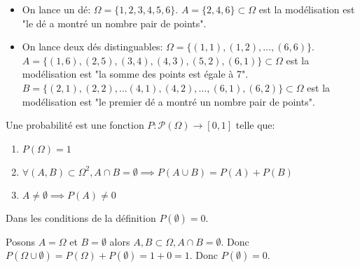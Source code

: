 \documentclass[a4paper, 12pt]{article}
\begin{document}
\begin{example}
    \begin{itemize}
        \item On lance un dé: $\Omega = \{1, 2, 3, 4, 5, 6\}$.
        $A = \{2, 4, 6\} \subset \Omega$ est la modélisation est "le dé a montré un nombre pair de points".
        \item On lance deux dés distinguables: $\Omega = \{(1, 1), (1, 2), \ldots, (6, 6)\}$.
        $A = \{(1, 6), (2, 5), (3, 4), (4, 3), (5, 2), (6, 1)\} \subset \Omega$ est la modélisation est "la somme des points est égale à 7".
        $B = \{(2, 1), (2, 2), \dots (4, 1), (4, 2), \dots, (6, 1), (6, 2)\} \subset \Omega$ est la modélisation est "le premier dé a montré un nombre pair de points".
    \end{itemize}
\end{example}

\begin{definition}
    Une probabilité est une fonction $P: \mathcal{P}(\Omega) \to [0, 1]$ telle que:
    \begin{enumerate}
        \item $P(\Omega) = 1$
        \item $\forall (A, B) \subset \Omega^2, A \cap B = \emptyset \implies P(A \cup B) = P(A) + P(B)$
        \item $A \neq \emptyset \implies P(A) \neq 0$
    \end{enumerate}
\end{definition}

\begin{proposition}
    Dans les conditions de la définition $P(\emptyset) = 0$.
\end{proposition}

\begin{demonstration}
    Posons $A = \Omega$ et $B = \emptyset$ alors $A, B \subset \Omega, A \cap B = \emptyset$. Donc $P(\Omega \cup \emptyset) = P(\Omega) + P(\emptyset) = 1 + 0 = 1$. Donc $P(\emptyset) = 0$.
\end{demonstration}
\end{document}
